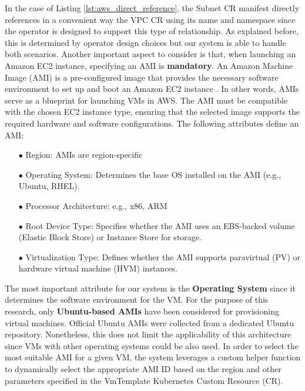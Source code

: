 In the case of Listing \ref{lst:aws_direct_reference}, the Subnet CR manifest directly references in a convenient way the VPC CR using its name and namespace since the operator is designed to support this type of relationship. 
As explained before, this is determined by operator design choices but our system is able to handle both scenarios.
\newline
Another important aspect to consider is that, when launching an Amazon EC2 instance, specifying an AMI is \textbf{mandatory}. 
An Amazon Machine Image (AMI) is a pre-configured image that provides the necessary software environment to set up and boot an Amazon EC2 instance \cite{aws_AMIs}. 
In other words, AMIs serve as a blueprint for launching VMs in AWS.
The AMI must be compatible with the chosen EC2 instance type, ensuring that the selected image supports the required hardware and software configurations.
The following attributes define an AMI:
\begin{itemize}[itemsep=0.2pt, topsep=1pt] 
  \item[$\bullet$] Region: AMIs are region-specific
  \item[$\bullet$] Operating System: Determines the base OS installed on the AMI (e.g., Ubuntu, RHEL).
  \item[$\bullet$] Processor Architecture: e.g., x86, ARM
  \item[$\bullet$] Root Device Type: Specifies whether the AMI uses an EBS-backed volume (Elastic Block Store) or Instance Store for storage.
  \item[$\bullet$] Virtualization Type: Defines whether the AMI supports paravirtual (PV) or hardware virtual machine (HVM) instances.
\end{itemize}

The most important attribute for our system is the \textbf{Operating System} since it determines the software environment for the VM.
For the purpose of this research, only \textbf{Ubuntu-based AMIs} have been considered for provisioning virtual machines. 
Official Ubuntu AMIs were collected from a dedicated Ubuntu repository.
Nonetheless, this does not limit the applicability of this architecture since VMs with other operating systems could be also used.
In order to select the most suitable AMI for a given VM, the system leverages a custom helper function to dynamically select the appropriate AMI ID based on the region and other parameters specified in the VmTemplate Kubernetes Custom Resource (CR).

\vspace{5.0cm}

